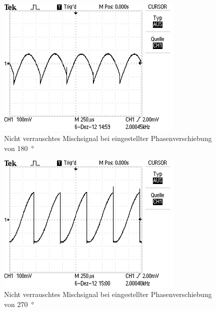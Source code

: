 \begin{figure}
  \centering
  \includegraphics[width=0.8\textwidth]{aufnahmen/phase_180_ohne_rauschen.jpg}
  \caption{Nicht verrauschtes Mischsignal bei eingestellter
    Phasenverschiebung von \SI{180}{\degree}}
  \label{fig:phase_180_nicht_verrauscht}
\end{figure}


\begin{figure}
  \centering
  \includegraphics[width=0.8\textwidth]{aufnahmen/phase_270_ohne_rauschen.jpg}
  \caption{Nicht verrauschtes Mischsignal bei eingestellter
    Phasenverschiebung von \SI{270}{\degree}}
  \label{fig:phase_270_nicht_verrauscht}
\end{figure}



